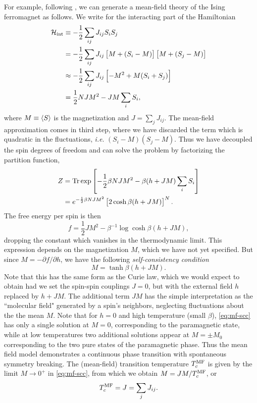 For example, following \textcite{cardy1996scaling}, we can generate a mean-field
theory of the Ising ferromagnet as follows. We write for the interacting part
of the Hamiltonian
\begin{align*}
  \mathcal{H}_{\mathrm{int}}
  &\equiv -\frac{1}{2} \sum_{ij} J_{ij} S_i S_j \\
  &= -\frac{1}{2} \sum_{ij} J_{ij} \left[M + (S_i - M)\right]\left[M + (S_j - M)\right] \\
  &\approx -\frac{1}{2} \sum_{ij} J_{ij} \left[-M^2 + M(S_i + S_j)\right] \\
  &= \frac{1}{2} N J M^2 - J M \sum_i S_i,
\end{align*}
where $M \equiv \left< S \right>$ is the magnetization and $J=\sum_j J_{ij}$. The
mean-field approximation comes in third step, where we have discarded the term
which is quadratic in the fluctuations, \textit{i.e.} $(S_i - M)(S_j - M)$.
Thus we have decoupled the spin degrees of freedom and can solve the problem by
factorizing the partition function,
\begin{align*}
  Z
  &= \operatorname{Tr}\exp\left[-\frac{1}{2} \beta N J M^2 - \beta(h + J M) \sum_i S_i\right] \\
  &= e^{-\frac{1}{2} \beta N J M^2} \left[2 \cosh \beta(h + J M)\right]^N.
\end{align*}
The free energy per spin is then
\begin{equation}
  f = \frac{1}{2} J M^2 - \beta^{-1}\log\cosh\beta(h + JM),
  \label{eq:mf-fe}
\end{equation}
dropping the constant which vanishes in the thermodynamic limit. This
expression depends on the magnetization $M$, which we have not yet specified.
But since $M = -\partial f / \partial h$, we have the following
\emph{self-consistency condition}
\begin{equation}
  M = \tanh\beta(h + J M).
  \label{eq:mf-scc}
\end{equation}
Note that this has the same form as the Curie law, which we would expect to
obtain had we set the spin-spin couplings $J=0$, but with the external field
$h$ replaced by $h + J M$. The additional term $J M$ has the simple
interpretation as the ``molecular field" generated by a spin's neighbors,
neglecting fluctuations about the the mean $M$. Note that for $h=0$ and high
temperature (small $\beta$), \cref{eq:mf-scc} has only a single solution at
$M=0$, corresponding to the paramagnetic state, while at low temperatures two
additional solutions appear at $M=\pm M_0$ corresponding to the two pure states
of the paramagnetic phase. Thus the mean field model demonstrates a continuous
phase transition with spontaneous symmetry breaking. The (mean-field)
transition temperature $T_c^{\mathrm{MF}}$ is given by the limit $M \to 0^+$ in
\cref{eq:mf-scc}, from which we obtain $M = J M / T_c^{\mathrm{MF}}$, or
\begin{equation}
  T_c^{\mathrm{MF}} = J = \sum_j J_{ij}.
\end{equation}

